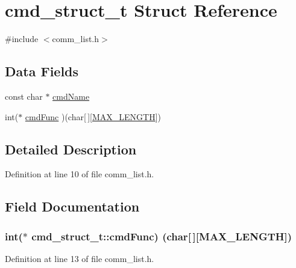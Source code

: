 \hypertarget{structs__cmd__struct}{}\section{cmd\+\_\+struct\+\_\+t Struct Reference}
\label{structs__cmd__struct}


{\ttfamily \#include $<$comm\+\_\+list.\+h$>$}

\subsection*{Data Fields}
\begin{DoxyCompactItemize}
\item 
const char $\ast$ \hyperlink{structs__cmd__struct_ad0c669ee8a2f89742a5b4e4e88123865}{cmd\+Name}
\item 
int($\ast$ \hyperlink{structs__cmd__struct_a9655d586925d40c94a0d11befa1a5b76}{cmd\+Func} )(char\mbox{[}$\,$\mbox{]}\mbox{[}\hyperlink{input_8h_a7a9a231e30b47bc0345749c8bd1e5077}{M\+A\+X\+\_\+\+L\+E\+N\+G\+TH}\mbox{]})
\end{DoxyCompactItemize}


\subsection{Detailed Description}


Definition at line 10 of file comm\+\_\+list.\+h.



\subsection{Field Documentation}
\subsubsection[{\texorpdfstring{cmd\+Func}{cmdFunc}}]{\setlength{\rightskip}{0pt plus 5cm}int($\ast$ cmd\+\_\+struct\+\_\+t\+::cmd\+Func) (char\mbox{[}$\,$\mbox{]}\mbox{[}{\bf M\+A\+X\+\_\+\+L\+E\+N\+G\+TH}\mbox{]})}\hypertarget{structs__cmd__struct_a9655d586925d40c94a0d11befa1a5b76}{}\label{structs__cmd__struct_a9655d586925d40c94a0d11befa1a5b76}


Definition at line 13 of file comm\+\_\+list.\+h.

